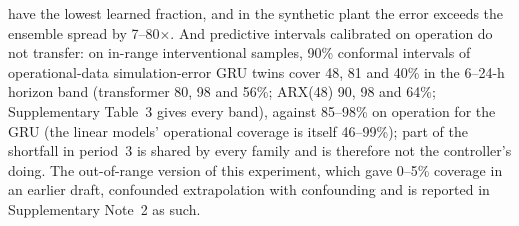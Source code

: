 \documentclass[11pt]{article}
\begin{document}
have the lowest learned fraction, and in the synthetic plant the error exceeds the ensemble spread by 7--80$\times$. And predictive intervals calibrated on operation do not transfer: on in-range interventional samples, 90\% conformal intervals of operational-data simulation-error GRU twins cover 48, 81 and 40\% in the 6--24-h horizon band (transformer 80, 98 and 56\%; ARX(48) 90, 98 and 64\%; Supplementary Table~3 gives every band), against 85--98\% on operation for the GRU (the linear models' operational coverage is itself 46--99\%); part of the shortfall in period~3 is shared by every family and is therefore not the controller's doing. The out-of-range version of this experiment, which gave 0--5\% coverage in an earlier draft, confounded extrapolation with confounding and is reported in Supplementary Note~2 as such.
\end{document}
